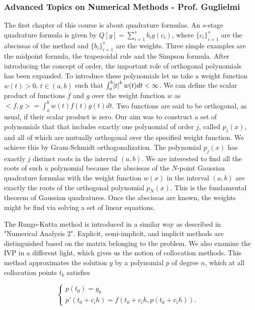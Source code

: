 \documentclass{article}
\begin{document}
\subsubsection{Advanced Topics on Numerical Methods - Prof. Guglielmi}
The first chapter of this course is about quadrature formulas. An $s$-stage quadrature formula is given by $Q[g] = \sum_{i=1}^s b_i g(c_i)$, where $\{c_i\}_{i=1}^s$  are the abscissas of the method and $\{b_i\}_{i=1}^s$ are the weights. Three simple examples are the midpoint formula, the trapezoidal rule and the Simpson formula. After introducing the concept of order, the important role of orthogonal polynomials has been expanded. To introduce these polynomials let us take a weight function $w(t) > 0$, $t \in (a,b)$ such that $\int_a^b \abs{t}^k w(t) dt < \infty$. We can define the scalar product of functions $f$ and $g$ over the weight function $w$ as $<f, g> = \int_a ^ b w(t) f(t) g(t) dt$. Two functions are said to be orthogonal, as usual, if their scalar product is zero. Our aim was to construct a set of polynomials that that includes exactly one polynomial of order $j$, called $p_j (x)$, and all of which are mutually orthogonal over the specified weight function. We achieve this by Gram-Schmidt orthogonalization. The polynomial $p_j (x)$ has exactly $j$ distinct roots in the interval $(a,b)$. We are interested to find all the roots of such a polynomial because the abscissas of the $N$-point Gaussian quadrature formulas with the weight function $w(x)$ in the interval $(a,b)$ are exactly the roots of the orthogonal polynomial $p_N(x)$. This is the fundamental theorem of Gaussian quadratures. Once the abscissas are known, the weights might be find via solving a set of linear equations.

The Runge-Kutta method is introduced in a similar way as described in "Numerical Analysis 2". Explicit, semi-implicit, and implicit methods are distinguished based on the matrix belonging to the problem. We also examine the IVP in a different light, which gives us the notion of collocation methods. This method approximates the solution $y$ by a polynomial $p$ of degree $n$, which at all collocation points $t_k$ satisfies

\begin{equation}
   \begin{cases}
               p(t_0) = y_0\\
               p'(t_0 + c_i h) = f(t_0 + c_i h, p(t_0 + c_i h)).
   \end{cases}
\end{equation}
\end{document}
